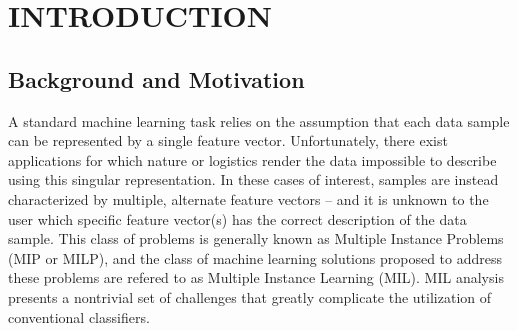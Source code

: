 \documentclass[12pt,dvips]{report}
\numberwithin{equation}{section}
\let\LaTeXStandardTableOfContents\tableofcontents
\renewcommand{\tableofcontents}{%
\begingroup%
\renewcommand{\bfseries}{\relax}%
\LaTeXStandardTableOfContents%
\endgroup%
}%
\begin{document}

\pagebreak

\vfill



\tableofcontents
\pagebreak

\listoffigures
\pagebreak

\listoftables
\pagebreak



\chapter{INTRODUCTION} \label{chapter:Introduction}


\section{Background and Motivation}

A standard machine learning task relies on the assumption that each
data sample can be represented by a single feature
vector. Unfortunately, there exist applications for which nature or
logistics render the data impossible to describe using this singular
representation. In these cases of interest, samples are instead characterized
by multiple, alternate feature vectors -- and it is unknown to the
user which specific feature vector(s) has the correct description of the data sample.
This class of problems is generally known as Multiple Instance Problems
(MIP or MILP), and the class of machine learning solutions proposed
to address these problems are refered to as Multiple Instance Learning
(MIL). MIL analysis presents a nontrivial set of challenges
that greatly complicate the utilization of conventional classifiers.
\end{document}
